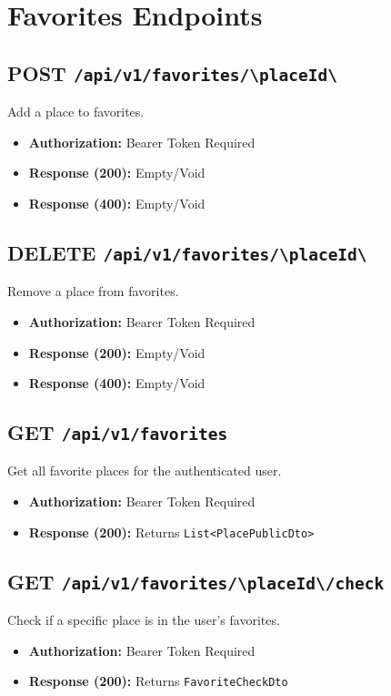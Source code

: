 \section{Favorites Endpoints}

\subsection{POST \texttt{/api/v1/favorites/\textbackslash{}{placeId\textbackslash{}}}}
Add a place to favorites.
\begin{itemize}
    \item \textbf{Authorization:} Bearer Token Required
    \item \textbf{Response (200):} Empty/Void
    \item \textbf{Response (400):} Empty/Void
\end{itemize}

\subsection{DELETE \texttt{/api/v1/favorites/\textbackslash{}{placeId\textbackslash{}}}}
Remove a place from favorites.
\begin{itemize}
    \item \textbf{Authorization:} Bearer Token Required
    \item \textbf{Response (200):} Empty/Void
    \item \textbf{Response (400):} Empty/Void
\end{itemize}

\subsection{GET \texttt{/api/v1/favorites}}
Get all favorite places for the authenticated user.
\begin{itemize}
    \item \textbf{Authorization:} Bearer Token Required
    \item \textbf{Response (200):} Returns \texttt{List<PlacePublicDto>}
\end{itemize}

\subsection{GET \texttt{/api/v1/favorites/\textbackslash{}{placeId\textbackslash{}}/check}}
Check if a specific place is in the user's favorites.
\begin{itemize}
    \item \textbf{Authorization:} Bearer Token Required
    \item \textbf{Response (200):} Returns \texttt{FavoriteCheckDto}
\end{itemize}

